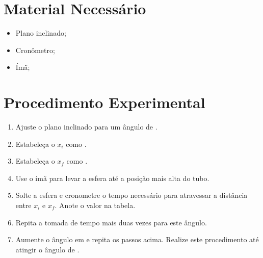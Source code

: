 \section{Material Necessário}

\begin{itemize}
	\item Plano inclinado;
	\item Cronômetro;
	\item Ímã;
\end{itemize}

\section{Procedimento Experimental}

\begin{enumerate}
	\item Ajuste o plano inclinado para um ângulo de .
	\item Estabeleça o $x_i$ como .
	\item Estabeleça o $x_f$ como .
	\item Use o ímã para levar a esfera até a posição mais alta do tubo.
	\item Solte a esfera e cronometre o tempo necessário para atravessar a distância entre $x_i$ e $x_f$. Anote o valor na tabela.
	\item Repita a tomada de tempo mais duas vezes para este ângulo.
	\item Aumente o ângulo em  e repita os passos acima. Realize este procedimento até atingir o ângulo de .
\end{enumerate}

\cleardoublepage


\vspace{15mm}

